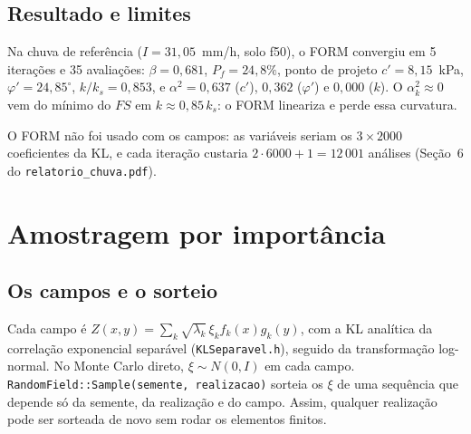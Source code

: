 \documentclass[11pt,a4paper]{article}
\begin{document}
\subsection{Resultado e limites}
Na chuva de referência ($I = 31{,}05$~mm/h, solo f50), o FORM convergiu em 5 iterações e 35 avaliações:
$\beta = 0{,}681$, $P_f = 24{,}8\%$, ponto de projeto $c' = 8{,}15$~kPa, $\varphi' = 24{,}85^\circ$, $k/k_s = 0{,}853$, e
$\alpha^2 = 0{,}637$ ($c'$), $0{,}362$ ($\varphi'$) e $0{,}000$ ($k$). O $\alpha_k^2 \approx 0$ vem do mínimo do $FS$ em
$k \approx 0{,}85\,k_s$: o FORM lineariza e perde essa curvatura.

O FORM não foi usado com os campos: as variáveis seriam os $3 \times 2000$ coeficientes da KL, e cada iteração custaria
$2 \cdot 6000 + 1 = 12\,001$ análises (Seção~6 do \texttt{relatorio\_chuva.pdf}).

\section{Amostragem por importância}
\subsection{Os campos e o sorteio}
Cada campo é $Z(x, y) = \sum_k \sqrt{\lambda_k}\, \xi_k f_k(x) g_k(y)$, com a KL analítica da correlação exponencial
separável (\texttt{KLSeparavel.h}), seguido da transformação log-normal. No Monte Carlo direto,
$\xi \sim N(0, I)$ em cada campo. \texttt{RandomField::Sample(semente, realizacao)} sorteia os $\xi$ de uma sequência
que depende só da semente, da realização e do campo. Assim, qualquer realização pode ser sorteada de novo sem rodar os
elementos finitos.
\end{document}
